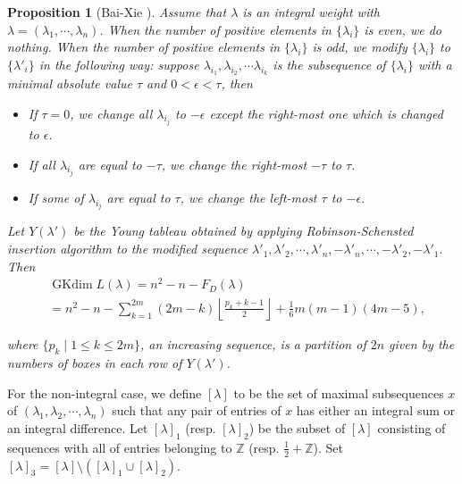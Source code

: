 \documentclass{amsart}[12pt]
\newtheorem{Pro}{Proposition}[section]
\newcommand{\gkd}{\operatorname{GKdim}}
\numberwithin{equation}{section}
\begin{document}
\begin{Pro}[Bai-Xie \cite{BX-2}]\label{modi}
	Assume that $ \lambda $ is an integral weight with $  \lambda=(\lambda_1,\cdots,\lambda_n)$.
	When the number of positive elements in $ \{\lambda_i \}$ is even, we do nothing.
	When the number of positive elements in $ \{\lambda_i \}$ is odd, we modify $ \{\lambda_i\} $ to $\{ \lambda'_i \}$ in the following way: suppose $ \lambda_{i_1}, \lambda_{i_2},\cdots \lambda_{i_k}$ is the subsequence of $ \{\lambda_i\} $ with a minimal absolute value $ \tau $ and $ 0< \epsilon< \tau $, then
	\begin{itemize}
		\item[(1)] If $ \tau=0 $,  we change all $ \lambda_{i_j}$ to $-\epsilon $  except  the right-most one which is changed to $ \epsilon $.
		\item[(2)] If all $ \lambda_{i_j} $ are equal to $ -\tau $,  we change the right-most  $-\tau$ to $ \tau $.
		\item[(3)] If some of  $ \lambda_{i_j} $ are equal to $ \tau $, we change the left-most $ \tau $  to $ -\epsilon $.
	\end{itemize}
	Let $ Y(\lambda') $ be the  Young tableau obtained by applying Robinson-Schensted insertion algorithm to the modified sequence \(
	\lambda'_1, \lambda'_2,\cdots,\lambda'_n,-\lambda'_n,\cdots, -\lambda'_2, -\lambda'_1.\)
	Then
	\begin{align*}
	&\gkd L(\lambda)=n^2-n-F_D(\lambda)\\
	&=n^2-n-\sum\limits_{k=1}^{2m} (2m-k)\left \lfloor \frac{p_k+k-1}{2}\right \rfloor +\frac{1}{6}m(m-1)(4m-5),
	\end{align*}
	
	
	where $ \{p_k\mid 1\leq k\leq 2m\} $, an increasing sequence, is  a partition of $ 2n $ given by the numbers of boxes in each row of $ Y(\lambda') $.
\end{Pro}



For the non-integral case, we define $ [\lambda] $ to be the set of maximal  subsequences  $ x  $ of  $ (\lambda_1,\lambda_2,\cdots,\lambda_n)  $ such that any pair of entries of $ x $  has either an integral sum or an integral difference. Let $ [\lambda]_1 $ (resp. $ [\lambda]_2 $) be the subset of $ [\lambda] $ consisting of sequences with  all of entries belonging to $ \mathbb{Z} $ (resp. $ \frac12+\mathbb{Z} $). Set $ [\lambda]_3=[\lambda]\setminus([\lambda]_1\cup [\lambda]_2) $.
	
\end{document}
